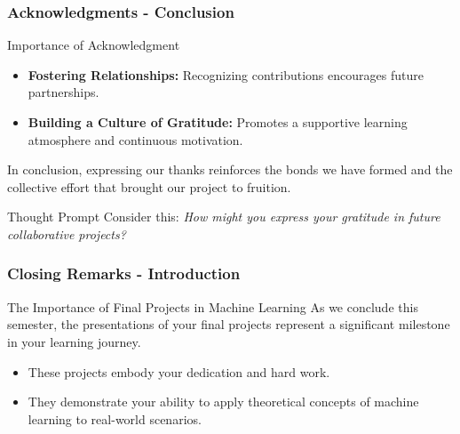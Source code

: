 \documentclass[aspectratio=169]{beamer}
\begin{document}
\begin{frame}[fragile]
    \frametitle{Acknowledgments - Conclusion}
    \begin{block}{Importance of Acknowledgment}
        \begin{itemize}
            \item \textbf{Fostering Relationships:} Recognizing contributions encourages future partnerships.
            \item \textbf{Building a Culture of Gratitude:} Promotes a supportive learning atmosphere and continuous motivation.
        \end{itemize}
    \end{block}

    In conclusion, expressing our thanks reinforces the bonds we have formed and the collective effort that brought our project to fruition. 

    \begin{block}{Thought Prompt}
        Consider this: \textit{How might you express your gratitude in future collaborative projects?}
    \end{block}
\end{frame}

\begin{frame}[fragile]
    \frametitle{Closing Remarks - Introduction}
    \begin{block}{The Importance of Final Projects in Machine Learning}
        As we conclude this semester, the presentations of your final projects represent a significant milestone in your learning journey. 
    \end{block}
    \begin{itemize}
        \item These projects embody your dedication and hard work.
        \item They demonstrate your ability to apply theoretical concepts of machine learning to real-world scenarios.
    \end{itemize}
\end{frame}
\end{document}
